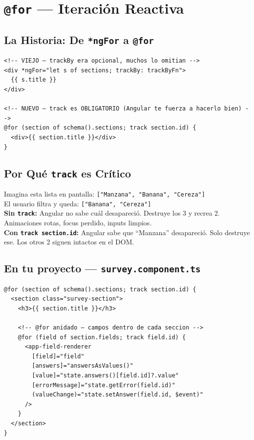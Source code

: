 \documentclass[12pt, a4paper]{article}
\begin{document}
\section{ \texttt{@for} --- Iteración Reactiva}

\subsection{La Historia: De \texttt{*ngFor} a \texttt{@for}}

\begin{lstlisting}
<!-- VIEJO — trackBy era opcional, muchos lo omitian -->
<div *ngFor="let s of sections; trackBy: trackByFn">
  {{ s.title }}
</div>

<!-- NUEVO — track es OBLIGATORIO (Angular te fuerza a hacerlo bien) -->
@for (section of schema().sections; track section.id) {
  <div>{{ section.title }}</div>
}
\end{lstlisting}

\subsection{Por Qué \texttt{track} es Crítico}

\begin{tcolorbox}[analogia, title={\emoji{id-button} La Huella Digital de Cada Elemento}]
Imagina esta lista en pantalla: \texttt{["Manzana", "Banana", "Cereza"]}\\
El usuario filtra y queda: \texttt{["Banana", "Cereza"]}\\[0.3cm]

\textbf{Sin \texttt{track}:} Angular no sabe cuál desapareció.
Destruye los 3 y recrea 2. Animaciones rotas, focus perdido, inputs limpios.\\[0.3cm]

\textbf{Con \texttt{track section.id}:} Angular sabe que ``Manzana'' desapareció.
Solo destruye ese. Los otros 2 siguen intactos en el DOM.
\end{tcolorbox}

\subsection{En tu proyecto --- \texttt{survey.component.ts}}

\begin{lstlisting}
@for (section of schema().sections; track section.id) {
  <section class="survey-section">
    <h3>{{ section.title }}</h3>

    <!-- @for anidado — campos dentro de cada seccion -->
    @for (field of section.fields; track field.id) {
      <app-field-renderer
        [field]="field"
        [answers]="answersAsValues()"
        [value]="state.answers()[field.id]?.value"
        [errorMessage]="state.getError(field.id)"
        (valueChange)="state.setAnswer(field.id, $event)"
      />
    }
  </section>
}
\end{lstlisting}
\end{document}
